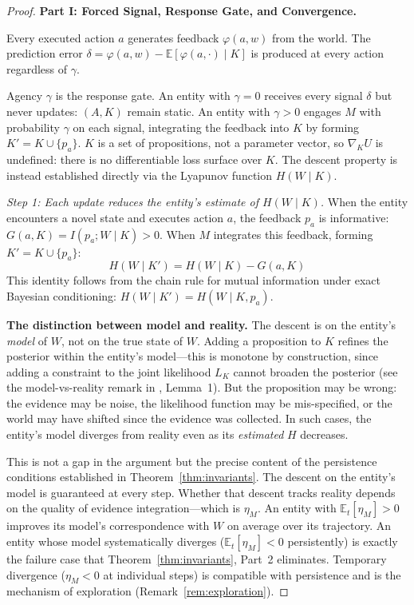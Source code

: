 \documentclass[11pt]{article}
\theoremstyle{definition}
\theoremstyle{remark}
\begin{document}
\begin{proof}
\textbf{Part I: Forced Signal, Response Gate, and Convergence.}

Every executed action $a$ generates feedback $\varphi(a, w)$ from the
world. The prediction error $\delta = \varphi(a, w) -
\mathbb{E}[\varphi(a, \cdot) \mid K]$ is produced at every action
regardless of $\gamma$.

Agency $\gamma$ is the response gate. An entity with $\gamma = 0$ receives
every signal $\delta$ but never updates: $(A, K)$ remain static. An
entity with $\gamma > 0$ engages $M$ with probability $\gamma$ on each
signal, integrating the feedback into $K$ by forming
$K' = K \cup \{p_a\}$. $K$ is a set of propositions, not a parameter
vector, so $\nabla_K U$ is undefined: there is no differentiable loss
surface over $K$. The descent property is instead established directly
via the Lyapunov function $H(W \mid K)$.

\emph{Step 1: Each update reduces the entity's estimate of $H(W \mid K)$.}
When the entity encounters a novel state and executes action $a$, the
feedback $p_a$ is informative: $G(a, K) = I(p_a; W \mid K) > 0$.
When $M$ integrates this feedback, forming $K' = K \cup \{p_a\}$:
\[
H(W \mid K') = H(W \mid K) - G(a, K)
\]
This identity follows from the chain rule for mutual information under
exact Bayesian conditioning: $H(W \mid K') = H(W \mid K, p_a)$.

\textbf{The distinction between model and reality.}
The descent is on the entity's \emph{model} of $W$, not on the true
state of $W$. Adding a proposition to $K$ refines the posterior within
the entity's model---this is monotone by construction, since adding a
constraint to the joint likelihood $L_K$ cannot broaden the posterior
(see the model-vs-reality remark in \cite{McCarthy2026c}, Lemma~1).
But the proposition may be wrong: the evidence may be noise, the
likelihood function may be mis-specified, or the world may have shifted
since the evidence was collected. In such cases, the entity's model
diverges from reality even as its \emph{estimated} $H$ decreases.

This is not a gap in the argument but the precise content of the
persistence conditions established in Theorem~\ref{thm:invariants}.
The descent on the entity's model is guaranteed at every step. Whether
that descent tracks reality depends on the quality of evidence
integration---which is $\eta_M$. An entity with
$\mathbb{E}_t[\eta_M] > 0$ improves its model's correspondence with
$W$ on average over its trajectory. An entity whose model
systematically diverges ($\mathbb{E}_t[\eta_M] < 0$ persistently) is
exactly the failure case that Theorem~\ref{thm:invariants}, Part~2
eliminates. Temporary divergence ($\eta_M < 0$ at individual steps)
is compatible with persistence and is the mechanism of exploration
(Remark~\ref{rem:exploration}).


\end{proof}
\end{document}
